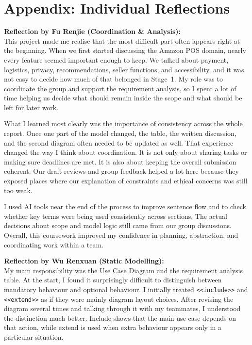\documentclass[11pt,a4paper]{article}
\begin{document}
\section*{Appendix: Individual Reflections}

\textbf{Reflection by Fu Renjie (Coordination \& Analysis):} \\
This project made me realise that the most difficult part often appears right at the beginning. When we first started discussing the Amazon POS domain, nearly every feature seemed important enough to keep. We talked about payment, logistics, privacy, recommendations, seller functions, and accessibility, and it was not easy to decide how much of that belonged in Stage~1. My role was to coordinate the group and support the requirement analysis, so I spent a lot of time helping us decide what should remain inside the scope and what should be left for later work.

What I learned most clearly was the importance of consistency across the whole report. Once one part of the model changed, the table, the written discussion, and the second diagram often needed to be updated as well. That experience changed the way I think about coordination. It is not only about sharing tasks or making sure deadlines are met. It is also about keeping the overall submission coherent. Our draft reviews and group feedback helped a lot here because they exposed places where our explanation of constraints and ethical concerns was still too weak.

I used AI tools near the end of the process to improve sentence flow and to check whether key terms were being used consistently across sections. The actual decisions about scope and model logic still came from our group discussions. Overall, this coursework improved my confidence in planning, abstraction, and coordinating work within a team.

\bigskip
\textbf{Reflection by Wu Renxuan (Static Modelling):} \\
My main responsibility was the Use Case Diagram and the requirement analysis table. At the start, I found it surprisingly difficult to distinguish between mandatory behaviour and optional behaviour. I initially treated \texttt{<<include>>} and \texttt{<<extend>>} as if they were mainly diagram layout choices. After revising the diagram several times and talking through it with my teammates, I understood the distinction much better. Include shows that the main use case depends on that action, while extend is used when extra behaviour appears only in a particular situation.
\end{document}
